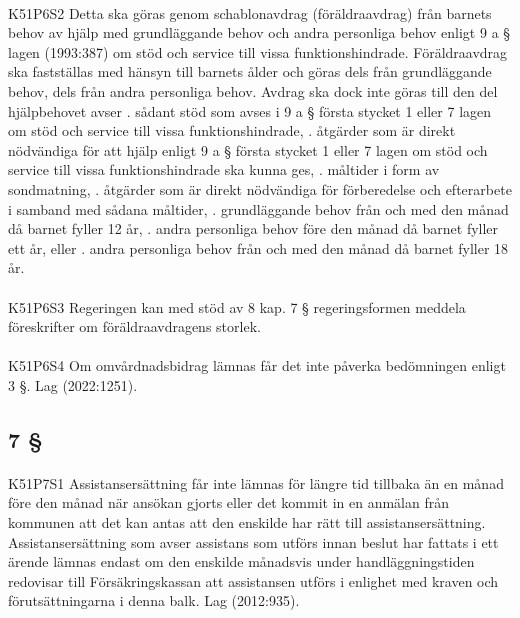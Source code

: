 \documentclass[a4paper,notitlepage,openany,10pt]{book}
\begin{document}
\paragraph*{}
{\tiny K51P6S2}
Detta ska göras genom schablonavdrag (föräldraavdrag) från barnets behov av hjälp med grundläggande behov och andra personliga behov enligt 9 a § lagen (1993:387) om stöd och service till vissa funktionshindrade. Föräldraavdrag ska fastställas med hänsyn till barnets ålder och göras dels från grundläggande behov, dels från andra personliga behov. Avdrag ska dock inte göras till den del hjälpbehovet avser
. sådant stöd som avses i 9 a § första stycket 1 eller 7 lagen om stöd och service till vissa funktionshindrade,
. åtgärder som är direkt nödvändiga för att hjälp enligt 9 a § första stycket 1 eller 7 lagen om stöd och service till vissa funktionshindrade ska kunna ges,
. måltider i form av sondmatning,
. åtgärder som är direkt nödvändiga för förberedelse och efterarbete i samband med sådana måltider,
. grundläggande behov från och med den månad då barnet fyller 12 år,
. andra personliga behov före den månad då barnet fyller ett år, eller
. andra personliga behov från och med den månad då barnet fyller 18 år.
\paragraph*{}
{\tiny K51P6S3}
Regeringen kan med stöd av 8 kap. 7 § regeringsformen meddela föreskrifter om föräldraavdragens storlek.
\paragraph*{}
{\tiny K51P6S4}
Om omvårdnadsbidrag lämnas får det inte påverka bedömningen enligt 3 §.
Lag (2022:1251).
\subsection*{7 §}
\paragraph*{}
{\tiny K51P7S1}
Assistansersättning får inte lämnas för längre tid tillbaka än en månad före den månad när ansökan gjorts eller det kommit in en anmälan från kommunen att det kan antas att den enskilde har rätt till assistansersättning.
Assistansersättning som avser assistans som utförs innan beslut har fattats i ett ärende lämnas endast om den enskilde månadsvis under handläggningstiden redovisar till Försäkringskassan att assistansen utförs i enlighet med kraven och förutsättningarna i denna balk.
Lag (2012:935).
\end{document}
